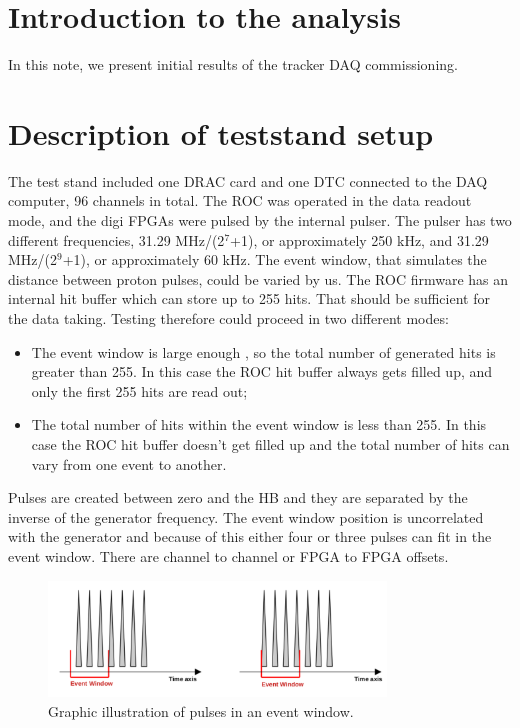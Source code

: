 \section {Introduction to the analysis}

In this note, we present initial results of the tracker DAQ commissioning.
\section{Description of teststand setup}
  The test stand included one DRAC card and one DTC connected to the DAQ computer,
  96 channels in total.
  The ROC was operated in the data readout mode, and the digi FPGAs were pulsed by the internal pulser.
  The pulser has two different frequencies,  31.29 MHz/(2$^7$+1), or approximately 250 kHz,
  and 31.29 MHz/(2$^9$+1), or approximately 60 kHz.
  The event window, that simulates the distance between proton pulses, could be varied by us.
  The ROC firmware has an internal hit buffer which can store up to 255 hits.
  That should be sufficient for the data taking.
  Testing therefore could proceed in two different modes:
  \begin{itemize}
  \item
    The event window is large enough , so the total number of generated hits is greater than 255. In this case
    the ROC hit buffer always gets filled up, and only the first 255 hits are read out;
  \item
    The total number of hits within the event window is less than 255.
    In this case the ROC hit buffer doesn't get filled up and the total number of hits
    can vary from one event to another.
  \end{itemize}
Pulses are created between zero and the HB and they are separated by the inverse of the generator frequency.
The event window position is uncorrelated with the generator and because of this either four or three pulses can fit in the event window.
There are channel to channel or FPGA to FPGA offsets.

\begin{figure}[!h]
\centering
\includegraphics[width =0.8\textwidth]{figures/pdf/eventwindow}
\caption{Graphic illustration of pulses in an event window.}
\label{fig:3}
\end{figure}
